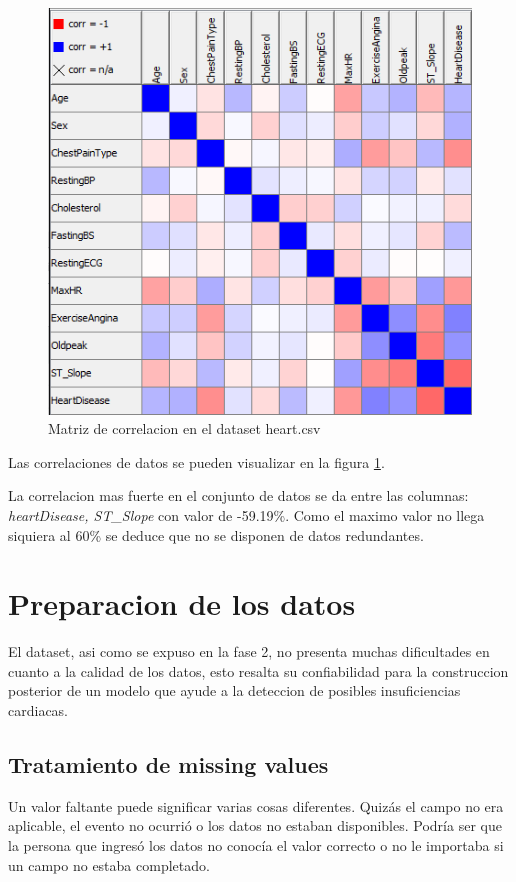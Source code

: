 \documentclass[12pt, letterpaper]{article}
\begin{document}
\begin{figure}
    \centering
    \includegraphics[scale=1]{correlacion.png}
    \caption{Matriz de correlacion en el dataset heart.csv}
    \label{fig:correlacion}
\end{figure}

Las correlaciones de datos se pueden visualizar en la figura \ref{fig:correlacion}.


La correlacion mas fuerte en el conjunto de datos se da entre las 
columnas: \textit{heartDisease, ST\_Slope} con valor de -59.19\%.
Como el maximo valor no llega siquiera al 60\% se deduce que no se disponen de datos redundantes.


\section{Preparacion de los datos}
El dataset, asi como se expuso en la fase 2, no presenta muchas dificultades en cuanto a la
calidad de los datos, esto resalta su confiabilidad para la construccion posterior de un
modelo que ayude a la deteccion de posibles insuficiencias cardiacas.

\subsection{Tratamiento de missing values}
Un valor faltante puede significar varias cosas diferentes. 
Quizás el campo no era aplicable, el evento no ocurrió o los datos no estaban disponibles. 
Podría ser que la persona que ingresó los datos no conocía el valor correcto o no le importaba 
si un campo no estaba completado. \cite{missin_values}
\end{document}
